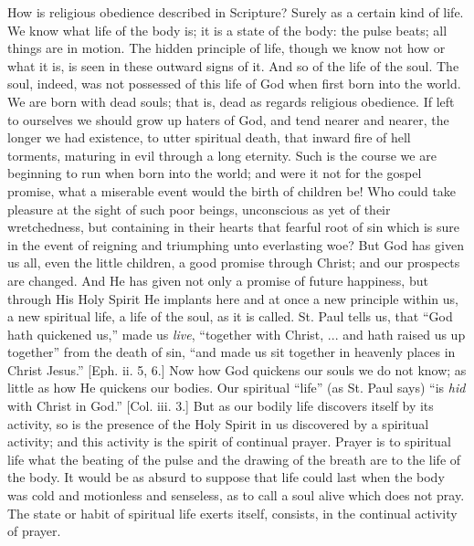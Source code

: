 How is religious obedience described in Scripture? Surely as a
certain kind of life. We know what life of the body is; it is a state
of the body: the pulse beats; all things are in motion. The hidden
principle of life, though we know not how or what it is, is seen in
these outward signs of it. And so of the life of the soul. The soul,
indeed, was not possessed of this life of God when first born into the
world. We are born with dead souls; that is, dead as regards religious
obedience. If left to ourselves we should grow up haters of God, and
tend nearer and nearer, the longer we had existence, to utter
spiritual death, that inward fire of hell torments, maturing in evil
through a long eternity. Such is the course we are beginning to run
when born into the world; and were it not for the gospel promise, what
a miserable event would the birth of children be! Who could take
pleasure at the sight of such poor beings, unconscious as yet of their
wretchedness, but containing in their hearts that fearful root of sin
which is sure in the event of reigning and triumphing unto everlasting
woe? But God has given us all, even the little children, a good
promise through Christ; and our prospects are changed. And He has
given not only a promise of future happiness, but through His Holy
Spirit He implants here and at once a new principle within us, a new
spiritual life, a life of the soul, as it is called. St. Paul tells
us, that ``God hath quickened us,'' made us \emph{live},
``together with Christ, ... and hath raised us up together''
from the death of sin, ``and made us sit together in heavenly
places in Christ Jesus.'' [Eph. ii. 5, 6.] Now how God quickens
our souls we do not know; as little as how He quickens our bodies. Our
spiritual ``life'' (as St. Paul says) ``is \emph{hid} with
Christ in God.'' [Col. iii. 3.] But as our bodily life discovers
itself by its activity, so is the presence of the Holy Spirit in us
discovered by a spiritual activity; and this activity is the spirit of
continual prayer. Prayer is to spiritual life what the beating of the
pulse and the drawing of the breath are to the life of the body. It
would be as absurd to suppose that life could last when the body was
cold and motionless and senseless, as to call a soul alive which does
not pray. The state or habit of spiritual life exerts itself,
consists, in the continual activity of prayer.

